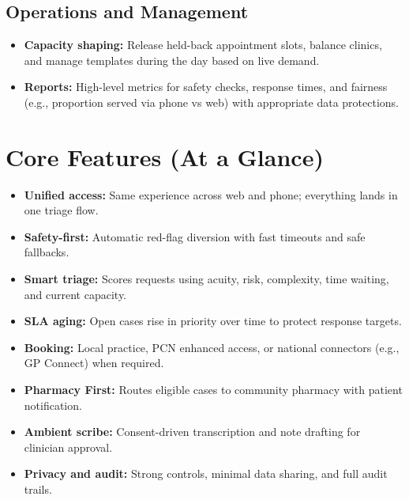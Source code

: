 \documentclass[11pt]{article}
\begin{document}
\subsection*{Operations and Management}
\begin{itemize}
  \item \textbf{Capacity shaping:} Release held-back appointment slots, balance clinics, and manage templates during the day based on live demand.
  \item \textbf{Reports:} High-level metrics for safety checks, response times, and fairness (e.g., proportion served via phone vs web) with appropriate data protections.
\end{itemize}

\section*{Core Features (At a Glance)}
\begin{itemize}
  \item \textbf{Unified access:} Same experience across web and phone; everything lands in one triage flow.
  \item \textbf{Safety-first:} Automatic red-flag diversion with fast timeouts and safe fallbacks.
  \item \textbf{Smart triage:} Scores requests using acuity, risk, complexity, time waiting, and current capacity.
  \item \textbf{SLA aging:} Open cases rise in priority over time to protect response targets.
  \item \textbf{Booking:} Local practice, PCN enhanced access, or national connectors (e.g., GP Connect) when required.
  \item \textbf{Pharmacy First:} Routes eligible cases to community pharmacy with patient notification.
  \item \textbf{Ambient scribe:} Consent-driven transcription and note drafting for clinician approval.
  \item \textbf{Privacy and audit:} Strong controls, minimal data sharing, and full audit trails.
\end{itemize}
\end{document}
